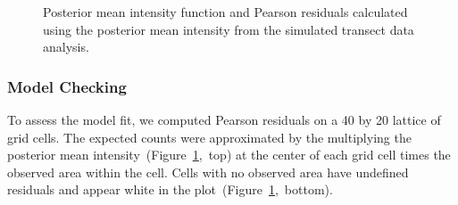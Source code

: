 \documentclass[]{interact}
\begin{document}
\begin{figure}[h!]


\caption{Posterior mean intensity function and Pearson residuals calculated
using the posterior mean intensity from the simulated transect data analysis.}
\label{effortintensity}
\end{figure}


\subsubsection{Model Checking}
\label{effortresid}

To assess the model fit, we computed Pearson residuals on a 40 by 20 lattice of
grid cells. The expected counts were approximated by the multiplying the
posterior mean intensity~(Figure~\ref{effortintensity},~top) at the center of
each grid cell times the observed area within the cell. Cells with no observed
area have undefined residuals and appear white in the
plot~(Figure~\ref{effortintensity},~bottom).
\end{document}
